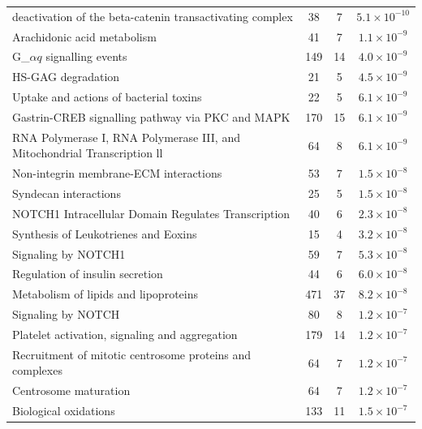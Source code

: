 \begin{table}[!Hp]
{\begin{tabular}{lccc}
  \rowcolor{Cluster_Red!15} 
  deactivation of the beta-catenin transactivating complex &  38 &   7 & $5.1 \times 10^{-10}$ \\ 
  \rowcolor{Cluster_Red!20} 
  Arachidonic acid metabolism &  41 &   7 & $1.1 \times 10^{-9}$ \\ 
  \rowcolor{Cluster_Red!15} 
  G_${\alpha q}$ signalling events & 149 &  14 & $4.0 \times 10^{-9}$ \\ 
  \rowcolor{Cluster_Red!20} 
  HS-GAG degradation &  21 &   5 & $4.5 \times 10^{-9}$ \\ 
  \rowcolor{Cluster_Red!15} 
  Uptake and actions of bacterial toxins &  22 &   5 & $6.1 \times 10^{-9}$ \\ 
  \rowcolor{Cluster_Red!20} 
  Gastrin-CREB signalling pathway via PKC and MAPK & 170 &  15 & $6.1 \times 10^{-9}$ \\ 
  \rowcolor{Cluster_Red!15} 
  RNA Polymerase I, RNA Polymerase III, and Mitochondrial Transcription \textcolor{Cluster_Red!15}{ll}  &  64 &   8 & $6.1 \times 10^{-9}$ \\ 
  \rowcolor{Cluster_Red!20} 
  Non-integrin membrane-ECM interactions &  53 &   7 & $1.5 \times 10^{-8}$ \\ 
  \rowcolor{Cluster_Red!15} 
  Syndecan interactions &  25 &   5 & $1.5 \times 10^{-8}$ \\ 
  \rowcolor{Cluster_Red!20} 
  NOTCH1 Intracellular Domain Regulates Transcription &  40 &   6 & $2.3 \times 10^{-8}$ \\ 
  \rowcolor{Cluster_Red!15} 
  Synthesis of Leukotrienes and Eoxins &  15 &   4 & $3.2 \times 10^{-8}$ \\ 
  \rowcolor{Cluster_Red!20} 
  Signaling by NOTCH1 &  59 &   7 & $5.3 \times 10^{-8}$ \\ 
  \rowcolor{Cluster_Red!15} 
  Regulation of insulin secretion &  44 &   6 & $6.0 \times 10^{-8}$ \\ 
  \rowcolor{Cluster_Red!20} 
  Metabolism of lipids and lipoproteins & 471 &  37 & $8.2 \times 10^{-8}$ \\ 
  \rowcolor{Cluster_Red!15} 
  Signaling by NOTCH &  80 &   8 & $1.2 \times 10^{-7}$ \\ 
  \rowcolor{Cluster_Red!20} 
  Platelet activation, signaling and aggregation & 179 &  14 & $1.2 \times 10^{-7}$ \\ 
  \rowcolor{Cluster_Red!15} 
  Recruitment of mitotic centrosome proteins and complexes &  64 &   7 & $1.2 \times 10^{-7}$ \\ 
  \rowcolor{Cluster_Red!20} 
  Centrosome maturation &  64 &   7 & $1.2 \times 10^{-7}$ \\ 
  \rowcolor{Cluster_Red!15} 
  Biological oxidations & 133 &  11 & $1.5 \times 10^{-7}$ \\ 
  \hline
\end{tabular}
}
\end{table}


